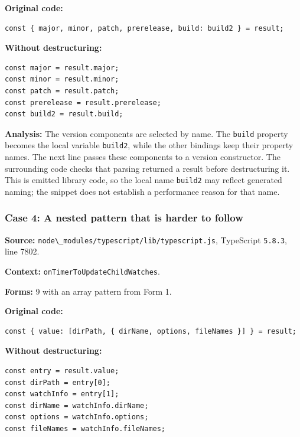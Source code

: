 \documentclass[
  11pt,
]{article}
\newcommand{\passthrough}[1]{#1}
\begin{document}
\textbf{Original code:}

\begin{lstlisting}
const { major, minor, patch, prerelease, build: build2 } = result;
\end{lstlisting}

\textbf{Without destructuring:}

\begin{lstlisting}
const major = result.major;
const minor = result.minor;
const patch = result.patch;
const prerelease = result.prerelease;
const build2 = result.build;
\end{lstlisting}

\textbf{Analysis:} The version components are selected by name. The
\passthrough{\lstinline!build!} property becomes the local variable
\passthrough{\lstinline!build2!}, while the other bindings keep their
property names. The next line passes these components to a version
constructor. The surrounding code checks that parsing returned a result
before destructuring it. This is emitted library code, so the local name
\passthrough{\lstinline!build2!} may reflect generated naming; the
snippet does not establish a performance reason for that name.

\subsubsection{Case 4: A nested pattern that is harder to
follow}\label{case-4-a-nested-pattern-that-is-harder-to-follow}

\textbf{Source:}
\passthrough{\lstinline!node\_modules/typescript/lib/typescript.js!},
TypeScript \passthrough{\lstinline!5.8.3!}, line 7802.

\textbf{Context:} \passthrough{\lstinline!onTimerToUpdateChildWatches!}.

\textbf{Forms:} 9 with an array pattern from Form 1.

\textbf{Original code:}

\begin{lstlisting}
const { value: [dirPath, { dirName, options, fileNames }] } = result;
\end{lstlisting}

\textbf{Without destructuring:}

\begin{lstlisting}
const entry = result.value;
const dirPath = entry[0];
const watchInfo = entry[1];
const dirName = watchInfo.dirName;
const options = watchInfo.options;
const fileNames = watchInfo.fileNames;
\end{lstlisting}
\end{document}
